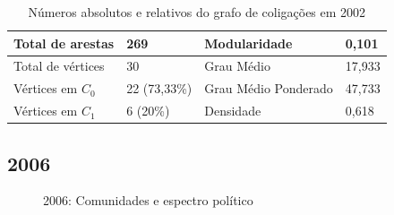 \begin{table}[H]
\centering
\begin{tabular}{|l|l|l|l|}
\hline
Total de arestas  & 269 & Modularidade         & 0,101 \\ \hline
Total de vértices & 30  & Grau Médio           & 17,933 \\ \hline
Vértices em $C_0$    & 22  (73,33\%) & Grau Médio Ponderado & 47,733 \\ \hline
Vértices em $C_1$    & 6 (20\%) & Densidade            &  0,618\\ \hline
\end{tabular}
\caption{Números absolutos e relativos do grafo de coligações em 2002}
\label{table-2002}
\end{table}

\subsection{2006}
\label{resultados__grafos--2006}

\begin{figure}[H]
\center
    \qquad
    
    \caption{2006: Comunidades e espectro político}
\end{figure}

